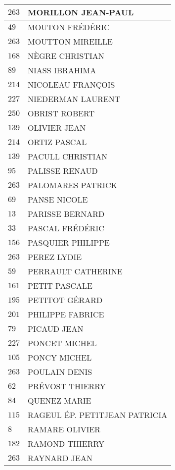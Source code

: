 \begin{xltabular}{\linewidth}{|l|X|}
    \hline
    $263$ & MORILLON JEAN-PAUL \\
    \hline
    $49$ & MOUTON FRÉDÉRIC \\
    \hline
    $263$ & MOUTTON MIREILLE \\
    \hline
    $168$ & NÈGRE CHRISTIAN \\
    \hline
    $89$ & NIASS IBRAHIMA \\
    \hline
    $214$ & NICOLEAU FRANÇOIS \\
    \hline
    $227$ & NIEDERMAN LAURENT \\
    \hline
    $250$ & OBRIST ROBERT \\
    \hline
    $139$ & OLIVIER JEAN \\
    \hline
    $214$ & ORTIZ PASCAL \\
    \hline
    $139$ & PACULL CHRISTIAN \\
    \hline
    $95$ & PALISSE RENAUD \\
    \hline
    $263$ & PALOMARES PATRICK \\
    \hline
    $69$ & PANSE NICOLE \\
    \hline
    $13$ & PARISSE BERNARD \\
    \hline
    $33$ & PASCAL FRÉDÉRIC \\
    \hline
    $156$ & PASQUIER PHILIPPE \\
    \hline
    $263$ & PEREZ LYDIE \\
    \hline
    $59$ & PERRAULT CATHERINE \\
    \hline
    $161$ & PETIT PASCALE \\
    \hline
    $195$ & PETITOT GÉRARD \\
    \hline
    $201$ & PHILIPPE FABRICE \\
    \hline
    $79$ & PICAUD JEAN \\
    \hline
    $227$ & PONCET MICHEL \\
    \hline
    $105$ & PONCY MICHEL \\
    \hline
    $263$ & POULAIN DENIS \\
    \hline
    $62$ & PRÉVOST THIERRY \\
    \hline
    $84$ & QUENEZ MARIE \\
    \hline
    $115$ & RAGEUL ÉP. PETITJEAN PATRICIA \\
    \hline
    $8$ & RAMARE OLIVIER \\
    \hline
    $182$ & RAMOND THIERRY \\
    \hline
    $263$ & RAYNARD JEAN \\

\end{xltabular}
